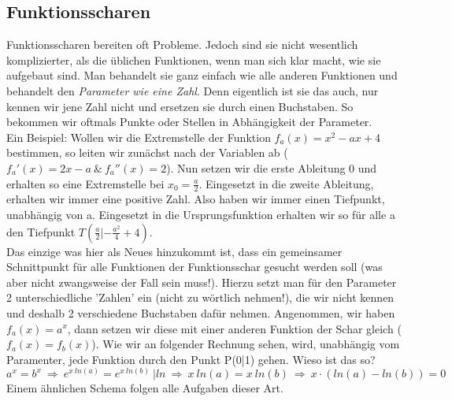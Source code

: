 \subsection{Funktionsscharen}
	Funktionsscharen bereiten oft Probleme. Jedoch sind sie nicht wesentlich
	komplizierter, als die üblichen Funktionen, wenn man sich klar macht, wie sie
	aufgebaut sind. Man behandelt sie ganz einfach wie alle anderen Funktionen und
	behandelt den \textit{Parameter wie eine Zahl}. Denn eigentlich ist sie das
	auch, nur kennen wir jene Zahl nicht und ersetzen sie durch einen Buchstaben.
	So bekommen wir oftmals Punkte oder Stellen in Abhängigkeit der Parameter. \\
	Ein Beispiel: Wollen wir die Extremstelle der Funktion \(f_a(x)=x^2-ax+4\)
	bestimmen, so leiten wir zunächst nach der Variablen ab (\(f_a'(x)=2x-a \ \& \
	f_a''(x)=2\)). Nun setzen wir die erste Ableitung 0 und erhalten so eine
	Extremstelle bei \(x_0=\frac{a}{2}\). Eingesetzt in die zweite Ableitung,
	erhalten wir immer eine positive Zahl. Also haben wir immer einen Tiefpunkt,
	unabhängig von a. Eingesetzt in die Ursprungsfunktion erhalten wir so für alle
	a den Tiefpunkt \(T(\frac{a}{2}|-\frac{a^2}{4}+4)\).\\
	Das einzige was hier als Neues hinzukommt ist, dass ein gemeinsamer
	Schnittpunkt für alle Funktionen der Funktionsschar gesucht werden soll (was
	aber nicht zwangsweise der Fall sein muss!). Hierzu setzt man für den
	Parameter 2 unterschiedliche 'Zahlen' ein (nicht zu wörtlich nehmen!), die wir
	nicht kennen und deshalb 2 verschiedene Buchstaben dafür nehmen.  Angenommen,
	wir haben \(f_a(x)=a^x\), dann setzen wir diese mit einer anderen Funktion der
	Schar gleich (\(f_a(x)=f_b(x)\)). Wie wir an folgender Rechnung sehen, wird,
	unabhängig vom Paramenter, jede Funktion durch den Punkt P(0|1) gehen. Wieso
	ist das so?
	\[a^x=b^x\ \Rightarrow\ e^{x\ ln(a)}=e^{x\ ln(b)} \ |ln\
	\Rightarrow\ x\ ln(a)=x\ ln(b)\ \Rightarrow\ x\cdot (ln(a)-ln(b))=0\]
	Einem ähnlichen Schema folgen alle Aufgaben dieser Art.


